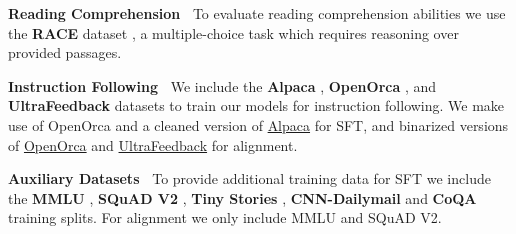 \textbf{Reading Comprehension\ }
To evaluate reading comprehension abilities we use the \textbf{RACE} dataset \cite{lai2017race}, a multiple-choice task which requires reasoning over provided passages.


\textbf{Instruction Following\ }
We include the \textbf{Alpaca} \cite{alpaca}, \textbf{OpenOrca} \cite{OpenOrca}, and \textbf{UltraFeedback} \cite{cui2023ultrafeedback} datasets to train our models for instruction following.
We make use of OpenOrca and a cleaned version of \href{https://huggingface.co/datasets/yahma/alpaca-cleaned}{Alpaca} for SFT, and binarized versions of \href{https://huggingface.co/datasets/Intel/orca_dpo_pairs}{OpenOrca} and \href{https://huggingface.co/datasets/argilla/ultrafeedback-binarized-preferences-cleaned}{UltraFeedback} for alignment.

\textbf{Auxiliary Datasets\ }
To provide additional training data for SFT we include the \textbf{MMLU} \cite{hendrycks2021measuring}, \textbf{SQuAD V2} \cite{rajpurkar-etal-2018-know,rajpurkar-etal-2016-squad}, \textbf{Tiny Stories} \cite{eldan2023tinystories}, \textbf{CNN-Dailymail} \cite{nallapati2016abstractive} and \textbf{CoQA} \cite{reddy2019coqa} training splits. For alignment we only include MMLU and SQuAD V2.

